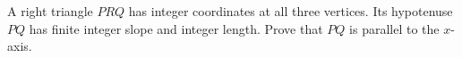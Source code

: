 A right triangle $PRQ$ has integer coordinates at all three vertices. Its hypotenuse $PQ$ has finite integer slope and integer length. Prove that $PQ$ is parallel to the $x$-axis.
